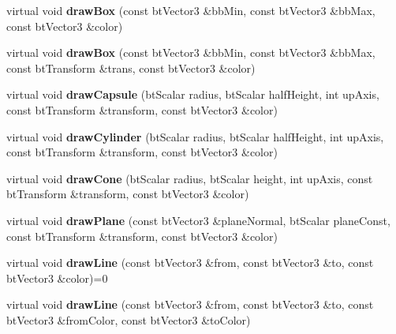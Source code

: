 \begin{DoxyCompactItemize}
virtual void {\bfseries draw\+Box} (const bt\+Vector3 \&bb\+Min, const bt\+Vector3 \&bb\+Max, const bt\+Vector3 \&color)
\item 
\mbox{\label{classbtIDebugDraw_a1895c36d90017439329ad2b375c92285}} 
virtual void {\bfseries draw\+Box} (const bt\+Vector3 \&bb\+Min, const bt\+Vector3 \&bb\+Max, const bt\+Transform \&trans, const bt\+Vector3 \&color)
\item 
\mbox{\label{classbtIDebugDraw_aec2ac4fe5ee1073a2eeb7f459a22dd87}} 
virtual void {\bfseries draw\+Capsule} (bt\+Scalar radius, bt\+Scalar half\+Height, int up\+Axis, const bt\+Transform \&transform, const bt\+Vector3 \&color)
\item 
\mbox{\label{classbtIDebugDraw_aa0f2076c26f158ba5579a07a931fabd6}} 
virtual void {\bfseries draw\+Cylinder} (bt\+Scalar radius, bt\+Scalar half\+Height, int up\+Axis, const bt\+Transform \&transform, const bt\+Vector3 \&color)
\item 
\mbox{\label{classbtIDebugDraw_a0059af5b0a43dd6b2d464f94938d4d14}} 
virtual void {\bfseries draw\+Cone} (bt\+Scalar radius, bt\+Scalar height, int up\+Axis, const bt\+Transform \&transform, const bt\+Vector3 \&color)
\item 
\mbox{\label{classbtIDebugDraw_a012926f8d101863d8d9d1af6f2fca0a0}} 
virtual void {\bfseries draw\+Plane} (const bt\+Vector3 \&plane\+Normal, bt\+Scalar plane\+Const, const bt\+Transform \&transform, const bt\+Vector3 \&color)
\item 
\mbox{\label{classbtIDebugDraw_a07b08e255ab4607ab5aeb24399332aff}} 
virtual void {\bfseries draw\+Line} (const bt\+Vector3 \&from, const bt\+Vector3 \&to, const bt\+Vector3 \&color)=0
\item 
\mbox{\label{classbtIDebugDraw_a0e9e92ccb0b2eec9c2fc8792a286af9a}} 
virtual void {\bfseries draw\+Line} (const bt\+Vector3 \&from, const bt\+Vector3 \&to, const bt\+Vector3 \&from\+Color, const bt\+Vector3 \&to\+Color)
\item 
\mbox{\label{classbtIDebugDraw_a29033d7c4f7d8c1745301bc4b5253f3b}} 

\end{DoxyCompactItemize}
